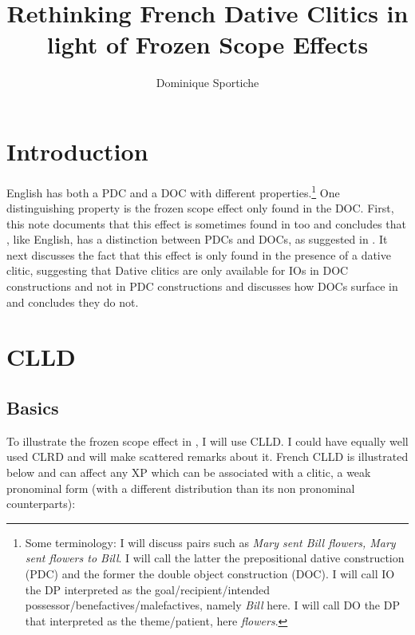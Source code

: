 \documentclass[output=paper]{langsci/langscibook}
\author{Dominique Sportiche\affiliation{University of California, Los Angeles}}
\title{Rethinking French Dative Clitics in light of Frozen Scope Effects}
\begin{document}
\glsresetall
\maketitle

\section{Introduction}

English has both a \gls{PDC} and a
\gls{DOC} with different
properties.\footnote{Some terminology: I will discuss pairs such as {\it Mary
    sent Bill flowers, Mary sent flowers to Bill}.  I will call the latter the
    prepositional dative construction (\gls{PDC}) and the former the double
    object construction (\gls{DOC}). I will call \gls{IO} the DP interpreted as
    the goal/recipient/intended possessor/benefactives/malefactives, namely
{\it Bill} here. I will call \gls{DO} the DP that interpreted as the
theme/patient, here {\it flowers}.} One distinguishing property is the frozen
scope effect only found in the DOC.  First, this note documents that this
effect is sometimes found in  too and concludes that , like
English, has a distinction between \glspl{PDC} and \glspl{DOC}, as suggested in
\cite{anagnostopoulou2005cross}.  It next discusses the fact that this effect
is only found in the presence of a dative clitic, suggesting that Dative
clitics are only available for \glspl{IO} in DOC constructions and not in
\gls{PDC} constructions and  discusses how \glspl{DOC} surface in  and concludes they do not.

\section{CLLD}

\subsection{Basics}\label{clld-htld}

To illustrate the frozen scope effect in , I will use \gls{CLLD}. I
could have equally well used \gls{CLRD} and will make scattered remarks about
it.  French \gls{CLLD} is illustrated below and can
affect any XP which can be associated with a clitic, a weak pronominal form
(with a different distribution than its non pronominal counterparts):
\end{document}
